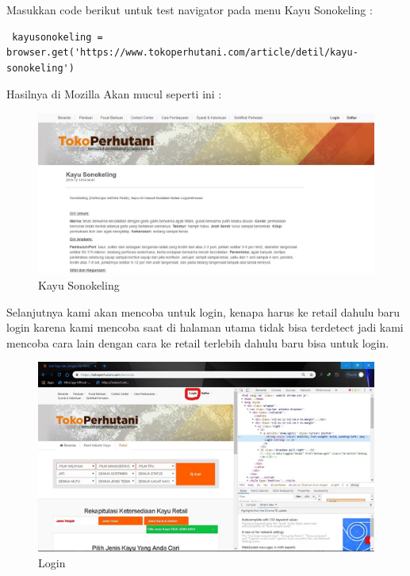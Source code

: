 Masukkan code berikut untuk test navigator pada menu Kayu Sonokeling :
\begin{verbatim}
 kayusonokeling =  browser.get('https://www.tokoperhutani.com/article/detil/kayu-sonokeling')
\end{verbatim}

Hasilnya  di Mozilla Akan mucul seperti ini :
\begin{figure}[h]
\centering
\includegraphics[scale=0.3]{figures/j3}
\caption{Kayu Sonokeling}
\end{figure}

\par
Selanjutnya kami akan mencoba untuk login, kenapa harus ke retail dahulu baru login karena kami mencoba saat di halaman utama tidak bisa terdetect jadi kami mencoba cara lain dengan cara ke retail terlebih dahulu baru bisa untuk login.
\begin{figure}[h]
\centering
\includegraphics[scale=0.3]{figures/L1}
\caption{Login}
\end{figure}
